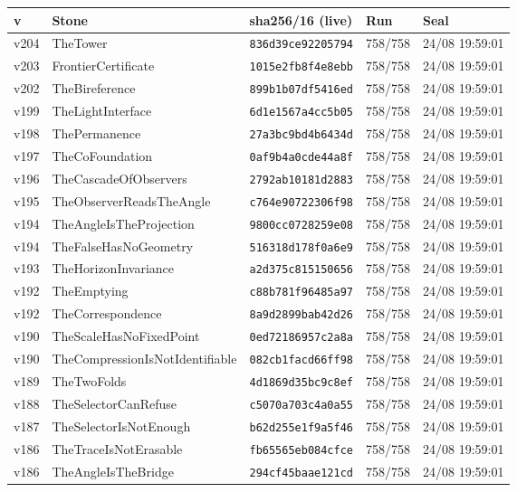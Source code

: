 \documentclass[11pt]{article}
\theoremstyle{definition}\newtheorem{deriv}{Derivation}
\begin{document}
{\small\begin{longtable}{@{}lllll@{}}\toprule v & Stone & sha256/16 (live) & Run & Seal \\ \midrule\endhead 
v204 & TheTower & \texttt{836d39ce92205794} & 758/758 & 24/08 19:59:01 \\
v203 & FrontierCertificate & \texttt{1015e2fb8f4e8ebb} & 758/758 & 24/08 19:59:01 \\
v202 & TheBireference & \texttt{899b1b07df5416ed} & 758/758 & 24/08 19:59:01 \\
v199 & TheLightInterface & \texttt{6d1e1567a4cc5b05} & 758/758 & 24/08 19:59:01 \\
v198 & ThePermanence & \texttt{27a3bc9bd4b6434d} & 758/758 & 24/08 19:59:01 \\
v197 & TheCoFoundation & \texttt{0af9b4a0cde44a8f} & 758/758 & 24/08 19:59:01 \\
v196 & TheCascadeOfObservers & \texttt{2792ab10181d2883} & 758/758 & 24/08 19:59:01 \\
v195 & TheObserverReadsTheAngle & \texttt{c764e90722306f98} & 758/758 & 24/08 19:59:01 \\
v194 & TheAngleIsTheProjection & \texttt{9800cc0728259e08} & 758/758 & 24/08 19:59:01 \\
v194 & TheFalseHasNoGeometry & \texttt{516318d178f0a6e9} & 758/758 & 24/08 19:59:01 \\
v193 & TheHorizonInvariance & \texttt{a2d375c815150656} & 758/758 & 24/08 19:59:01 \\
v192 & TheEmptying & \texttt{c88b781f96485a97} & 758/758 & 24/08 19:59:01 \\
v192 & TheCorrespondence & \texttt{8a9d2899bab42d26} & 758/758 & 24/08 19:59:01 \\
v190 & TheScaleHasNoFixedPoint & \texttt{0ed72186957c2a8a} & 758/758 & 24/08 19:59:01 \\
v190 & TheCompressionIsNotIdentifiable & \texttt{082cb1facd66ff98} & 758/758 & 24/08 19:59:01 \\
v189 & TheTwoFolds & \texttt{4d1869d35bc9c8ef} & 758/758 & 24/08 19:59:01 \\
v188 & TheSelectorCanRefuse & \texttt{c5070a703c4a0a55} & 758/758 & 24/08 19:59:01 \\
v187 & TheSelectorIsNotEnough & \texttt{b62d255e1f9a5f46} & 758/758 & 24/08 19:59:01 \\
v186 & TheTraceIsNotErasable & \texttt{fb65565eb084cfce} & 758/758 & 24/08 19:59:01 \\
v186 & TheAngleIsTheBridge & \texttt{294cf45baae121cd} & 758/758 & 24/08 19:59:01 \\

\end{longtable}}
\end{document}
